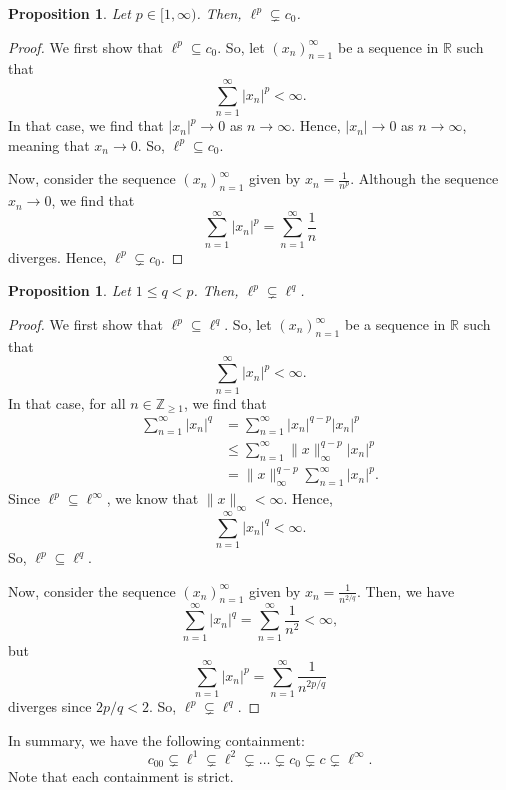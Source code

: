 \documentclass[a4paper, openany]{memoir}
\theoremstyle{definition}
\theoremstyle{plain}
\newtheorem{proposition}[definition]{Proposition}
\begin{document}
    \begin{proposition}
        Let $p \in [1, \infty)$. Then, $\ell^p \subsetneq c_0$.
    \end{proposition}
    \begin{proof}
        We first show that $\ell^p \subseteq c_0$. So, let $(x_n)_{n=1}^\infty$ be a sequence in $\mathbb{R}$ such that
        \[\sum_{n=1}^\infty |x_n|^p < \infty.\]
        In that case, we find that $|x_n|^p \to 0$ as $n \to \infty$. Hence, $|x_n| \to 0$ as $n \to \infty$, meaning that $x_n \to 0$. So, $\ell^p \subseteq c_0$.

        Now, consider the sequence $(x_n)_{n=1}^\infty$ given by $x_n = \frac{1}{n^p}$. Although the sequence $x_n \to 0$, we find that
        \[\sum_{n=1}^\infty |x_n|^p = \sum_{n=1}^\infty \frac{1}{n}\]
        diverges. Hence, $\ell^p \subsetneq c_0$.
    \end{proof}

    \begin{proposition}
        Let $1 \leq q < p$. Then, $\ell^p \subsetneq \ell^q$.
    \end{proposition}
    \begin{proof}
        We first show that $\ell^p \subseteq \ell^q$. So, let $(x_n)_{n=1}^\infty$ be a sequence in $\mathbb{R}$ such that
        \[\sum_{n=1}^\infty |x_n|^p < \infty.\]
        In that case, for all $n \in \mathbb{Z}_{\geq 1}$, we find that
        \begin{align*}
            \sum_{n=1}^\infty |x_n|^q &= \sum_{n=1}^\infty |x_n|^{q-p} |x_n|^{p} \\
            &\leq \sum_{n=1}^\infty \lVert x \rVert_\infty^{q-p} |x_n|^p \\
            &= \lVert x \rVert_\infty^{q-p} \sum_{n=1}^\infty |x_n|^p.
        \end{align*}
        Since $\ell^p \subseteq \ell^\infty$, we know that $\lVert x \rVert_\infty < \infty$. Hence, 
        \[\sum_{n=1}^\infty |x_n|^q < \infty.\]
        So, $\ell^p \subseteq \ell^q$.

        Now, consider the sequence $(x_n)_{n=1}^\infty$ given by $x_n = \frac{1}{n^{2/q}}$. Then, we have
        \[\sum_{n=1}^\infty |x_n|^q = \sum_{n=1}^\infty \frac{1}{n^2} < \infty,\]
        but
        \[\sum_{n=1}^\infty |x_n|^p = \sum_{n=1}^\infty \frac{1}{n^{2p/q}}\]
        diverges since $2p/q < 2$. So, $\ell^p \subsetneq \ell^q$.
    \end{proof}
    
    In summary, we have the following containment:
    \[c_{00} \subsetneq \ell^1 \subsetneq \ell^2 \subsetneq \dots \subsetneq c_0 \subsetneq c \subsetneq \ell^\infty.\]
    Note that each containment is strict.
    \newpage
\end{document}
